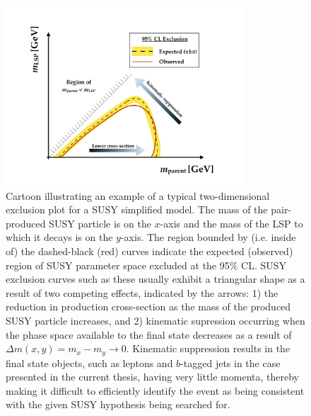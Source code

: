 
\begin{figure}[!htb]
    \begin{center}
        \includegraphics[width=0.8\textwidth]{figures/search_stop2l/susy_exclusion_cartoonPDF}
        \caption{
            Cartoon illustrating an example of a typical two-dimensional exclusion plot
            for a SUSY simplified model.
            The mass of the pair-produced SUSY particle is on the $x$-axis and the mass of the
            LSP to which it decays is on the $y$-axis.
            The region bounded by (i.e. inside of) the dashed-black (red) curves indicate
            the expected (observed) region of SUSY parameter space excluded at the 95\% CL.
            SUSY exclusion curves such as these usually exhibit a triangular shape as a result
            of two competing effects, indicated by the arrows: 1) the reduction in production
            cross-section as the mass of the produced SUSY particle increases, and 2) kinematic
            supression occurring when the phase space available to the final state decreases
            as a result of $\Delta m (x, y) = m_x - m_y \rightarrow 0$.
            Kinematic suppression results in the final state objects, such as leptons and $b$-tagged jets
            in the case presented in the current thesis,
            having very little momenta, thereby making it difficult to efficiently identify
            the event as being consistent with the given SUSY hypothesis being searched for.
        }
        \label{fig:susy_exclusion_cartoon}
    \end{center}
\end{figure}

